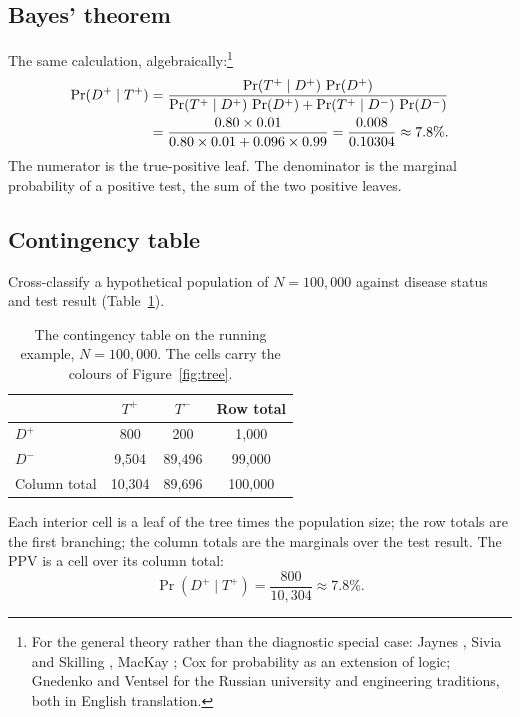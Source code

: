 \documentclass[11pt]{article}
\begin{document}
\subsection{Bayes' theorem}
\label{sec:bayes}

The same calculation, algebraically:\footnote{For the general theory rather than the diagnostic special case: Jaynes \cite{jaynes2003}, Sivia and Skilling \cite{sivia2006}, MacKay \cite{mackay2003}; Cox \cite{cox1946} for probability as an extension of logic; Gnedenko \cite{gnedenko1976} and Ventsel \cite{ventsel1965} for the Russian university and engineering traditions, both in English translation.}
\begin{align*}
  \Pr(D^+ \mid T^+) &= \frac{\Pr(T^+ \mid D^+)\,\Pr(D^+)}{\Pr(T^+ \mid D^+)\,\Pr(D^+) + \Pr(T^+ \mid D^-)\,\Pr(D^-)} \notag \\
  &= \frac{0.80 \times 0.01}{0.80 \times 0.01 + 0.096 \times 0.99} = \frac{0.008}{0.10304} \approx 7.8\%.
\end{align*}
The numerator is the true-positive leaf. The denominator is the marginal probability of a positive test, the sum of the two positive leaves.

\subsection{Contingency table}
\label{sec:table}

Cross-classify a hypothetical population of $N = 100{,}000$ against disease status and test result (Table~\ref{tab:counts}).

\begin{table}[H]
\centering
\begin{tabular}{l|cc|c}
\toprule
                  & $T^+$    & $T^-$    & Row total \\
\midrule
$D^+$          & \cellcolor{tpcol}800      & \cellcolor{fncol}200      & 1{,}000  \\
$D^-$          & \cellcolor{fpcol}9{,}504  & \cellcolor{tncol}89{,}496 & 99{,}000 \\
\midrule
Column total      & 10{,}304 & 89{,}696 & 100{,}000 \\
\bottomrule
\end{tabular}
\caption{The contingency table on the running example, $N = 100{,}000$. The cells carry the colours of Figure~\ref{fig:tree}.}
\label{tab:counts}
\end{table}

Each interior cell is a leaf of the tree times the population size; the row totals are the first branching; the column totals are the marginals over the test result. The PPV is a cell over its column total:
\begin{equation*}
  \Pr(D^+ \mid T^+) = \frac{800}{10{,}304} \approx 7.8\%.
\end{equation*}
\end{document}

